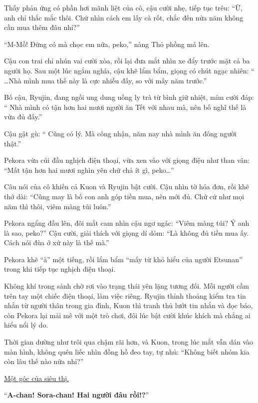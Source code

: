 \documentclass[../main.tex]{subfiles}
\begin{document}
Thấy phản ứng có phần hơi mãnh liệt của cô, cậu cười nhẹ, tiếp tục trêu: ``Ừ, anh chỉ thắc mắc thôi. Chứ nhìn cách em lấy cà rốt, chắc đến nửa năm không cần mua thêm đâu nhỉ?''

``M-Mồ! Đừng có mà chọc em nữa, peko,'' nàng Thỏ phồng má lên.

Cậu con trai chỉ nhún vai cười xòa, rồi lại đưa mắt nhìn xe đẩy trước mặt cả ba người họ. Sau một lúc ngắm nghía, cậu khẽ lẩm bẩm, giọng có chút ngạc nhiên: ``{\color{red} \dots Nhà mình mua thế này là cực nhiều đấy, so với mấy năm trước.}''

Bố cậu, Ryujin, đang ngồi ung dung uống ly trà từ bình giữ nhiệt, mỉm cười đáp: ``{\color{red} Nhà mình có tận hơn hai mươi người ăn Tết với nhau mà, nên bố nghĩ thế là vừa đủ đấy.}''

Cậu gật gù: ``{\color{red} Cũng có lý.} Mà công nhận, năm nay nhà mình ăn đông người thật.''

Pekora vừa cúi đầu nghịch điện thoại, vừa xen vào với giọng điệu như than vãn: ``Mất tận hơn hai mươi nghìn yên chứ chả ít gì, peko\dots''

Câu nói của cô khiến cả Kuon và Ryujin bật cười. Cậu nhìn tờ hóa đơn, rồi khẽ thở dài: ``Cũng may là bố con anh góp tiền mua, nên mới đủ. Chứ cứ như mọi năm thì thôi, viêm màng túi luôn.''

Pekora ngẩng đầu lên, đôi mắt cam nhìn cậu  ngơ ngác: ``Viêm màng túi? Ý anh là sao, peko?'' Cậu cười, giải thích với giọng dí dỏm: ``Là không đủ tiền mua ấy. Cách nói đùa ở xứ này là thế mà.''

Pekora khẽ ``à'' một tiếng, rồi lẩm bẩm ``mấy từ khó hiểu của người Etsunan'' trong khi tiếp tục nghịch điện thoại.

Không khí trong sảnh chờ rơi vào trạng thái yên lặng tương đối. Mỗi người cầm trên tay một chiếc điện thoại, làm việc riêng. Ryujin thỉnh thoảng kiểm tra tin nhắn từ người thân trong gia đình, Kuon thì tranh thủ lướt tin nhắn và đọc báo, còn Pekora lại mải mê với một trò chơi, đôi lúc bật cười khúc khích mà chẳng ai hiểu nổi lý do.

Thời gian dường như trôi qua chậm rãi hơn, và Kuon, trong lúc mắt vẫn dán vào màn hình, không quên liếc nhìn đồng hồ đeo tay, tự nhủ: ``Không biết nhóm kia còn lâu thế nào nữa nhỉ?''

\il

\begin{center}
    \uline{Một góc của siêu thị.}
\end{center}

``\textbf{A-chan! Sora-chan! Hai người đâu rồi!?}''
\end{document}
